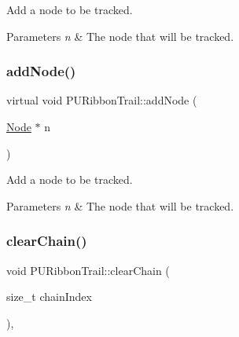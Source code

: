 Add a node to be tracked. 
\begin{DoxyParams}{Parameters}
{\em n} & The node that will be tracked. \\
\hline
\end{DoxyParams}
\mbox{\label{classPURibbonTrail_a1ffe32a409da10330b7200bc77e25b0d}} 
\subsubsection{\texorpdfstring{add\+Node()}{addNode()}\hspace{0.1cm}{\footnotesize\ttfamily [2/2]}}
{\footnotesize\ttfamily virtual void P\+U\+Ribbon\+Trail\+::add\+Node (\begin{DoxyParamCaption}\item[{\hyperlink{classNode}{Node} $\ast$}]{n }\end{DoxyParamCaption})\hspace{0.3cm}{\ttfamily [virtual]}}

Add a node to be tracked. 
\begin{DoxyParams}{Parameters}
{\em n} & The node that will be tracked. \\
\hline
\end{DoxyParams}
\mbox{\label{classPURibbonTrail_adb54132f235ef4e7378059f72c76afd2}} 
\subsubsection{\texorpdfstring{clear\+Chain()}{clearChain()}\hspace{0.1cm}{\footnotesize\ttfamily [1/2]}}
{\footnotesize\ttfamily void P\+U\+Ribbon\+Trail\+::clear\+Chain (\begin{DoxyParamCaption}\item[{size\+\_\+t}]{chain\+Index }\end{DoxyParamCaption})\hspace{0.3cm}{\ttfamily [override]}, {\ttfamily [virtual]}}







